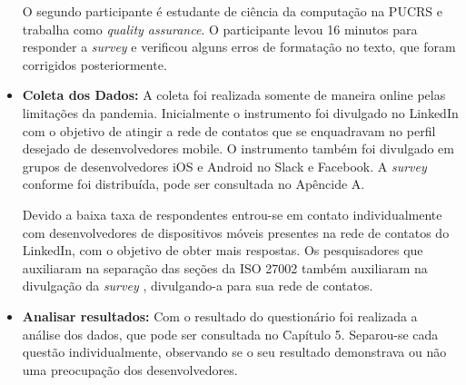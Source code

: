 \begin{itemize}
 O segundo participante é estudante de ciência da computação na PUCRS e trabalha como \textit{quality assurance}. O participante levou 16 minutos para responder a \textit{survey} e verificou alguns erros de formatação no texto, que foram corrigidos posteriormente.  
 

\item \textbf{Coleta dos Dados:} A coleta foi realizada somente de maneira online pelas limitações da pandemia. Inicialmente o instrumento foi divulgado no LinkedIn com o objetivo de atingir a rede de contatos que se enquadravam no perfil desejado de desenvolvedores mobile. O instrumento também foi divulgado em grupos de desenvolvedores iOS e Android no Slack e Facebook. A \textit{survey} conforme foi distribuída, pode ser consultada no Apêncide A.

Devido a baixa taxa de respondentes entrou-se em contato individualmente com desenvolvedores de dispositivos móveis presentes na rede de contatos do LinkedIn, com o objetivo de obter mais respostas. Os pesquisadores que auxiliaram na separação das seções da ISO 27002 também auxiliaram na divulgação da \textit{survey} , divulgando-a para sua rede de contatos. 


\item \textbf{Analisar resultados:} Com o resultado do questionário foi realizada a análise dos dados, que pode ser consultada no Capítulo 5. Separou-se cada questão individualmente, observando se o seu resultado demonstrava ou não uma preocupação dos desenvolvedores.
\end{itemize}





